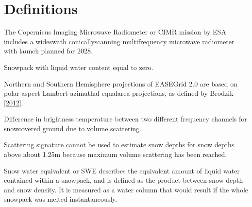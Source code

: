 \documentclass[letterpaper,10pt,english]{jupyterBook}
\begin{document}
\chapter{Definitions}
\label{\detokenize{book/definitions:definitions}}\label{\detokenize{book/definitions::doc}}\begin{description}
\sphinxAtStartPar
The Copernicus Imaging Microwave Radiometer or CIMR mission by ESA includes a wide\sphinxhyphen{}swath conically\sphinxhyphen{}scanning multi\sphinxhyphen{}frequency microwave radiometer with launch planned for 2028.

\sphinxAtStartPar
Snowpack with liquid water content equal to zero.

\sphinxAtStartPar
Northern and Southern Hemisphere projections of EASE\sphinxhyphen{}Grid 2.0 are based on polar aspect Lambert azimuthal equal\sphinxhyphen{}area projections, as defined by Brodzik  {[}\hyperlink{cite.book/references:id17}{2012}{]}.

\sphinxAtStartPar
Difference in brightness temperature between two different frequency channels for snow\sphinxhyphen{}covered ground due to volume scattering.

\sphinxAtStartPar
Scattering signature cannot be used to estimate snow depths for snow depths above about 1.25m because maximum volume scattering has been reached.

\sphinxAtStartPar
Snow water equivalent or SWE describes the equivalent amount of liquid water contained within a snowpack, and is defined as the product between snow depth and snow density. It is measured as a water column that would result if the whole snowpack was melted instantaneously.


\end{description}
\end{document}
